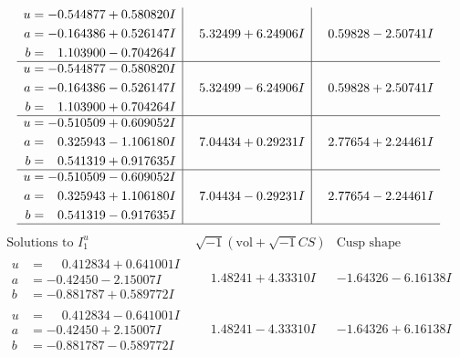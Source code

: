 \documentclass[1p]{elsarticle_modified}
\theoremstyle{definition}
\newcommand{\I}{\sqrt{-1}}
\begin{document}
$$\begin{array}{c|c|c}
\begin{aligned}
u &= -0.544877 + 0.580820 I \\
a &= -0.164386 + 0.526147 I \\
b &= \phantom{-}1.103900 - 0.704264 I\end{aligned}
 & \phantom{-}5.32499 + 6.24906 I & \phantom{-}0.59828 - 2.50741 I \\ \hline\begin{aligned}
u &= -0.544877 - 0.580820 I \\
a &= -0.164386 - 0.526147 I \\
b &= \phantom{-}1.103900 + 0.704264 I\end{aligned}
 & \phantom{-}5.32499 - 6.24906 I & \phantom{-}0.59828 + 2.50741 I \\ \hline\begin{aligned}
u &= -0.510509 + 0.609052 I \\
a &= \phantom{-}0.325943 - 1.106180 I \\
b &= \phantom{-}0.541319 + 0.917635 I\end{aligned}
 & \phantom{-}7.04434 + 0.29231 I & \phantom{-}2.77654 + 2.24461 I \\ \hline\begin{aligned}
u &= -0.510509 - 0.609052 I \\
a &= \phantom{-}0.325943 + 1.106180 I \\
b &= \phantom{-}0.541319 - 0.917635 I\end{aligned}
 & \phantom{-}7.04434 - 0.29231 I & \phantom{-}2.77654 - 2.24461 I\\
 \hline 
 \end{array}$$\newpage$$\begin{array}{c|c|c}  
\text{Solutions to }I^u_{1}& \I (\text{vol} + \sqrt{-1}CS) & \text{Cusp shape}\\
 \hline 
\begin{aligned}
u &= \phantom{-}0.412834 + 0.641001 I \\
a &= -0.42450 - 2.15007 I \\
b &= -0.881787 + 0.589772 I\end{aligned}
 & \phantom{-}1.48241 + 4.33310 I & -1.64326 - 6.16138 I \\ \hline\begin{aligned}
u &= \phantom{-}0.412834 - 0.641001 I \\
a &= -0.42450 + 2.15007 I \\
b &= -0.881787 - 0.589772 I\end{aligned}
 & \phantom{-}1.48241 - 4.33310 I & -1.64326 + 6.16138 I \\ \hline\begin{aligned}

\end{aligned}
\end{array}$$
\end{document}
